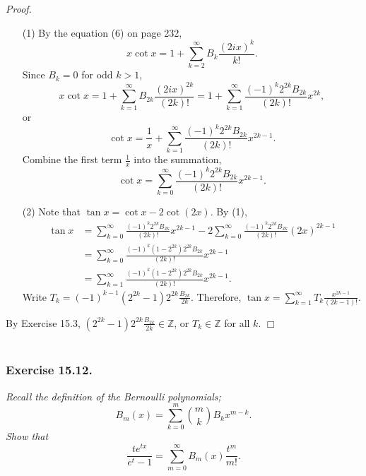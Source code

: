 \documentclass{article}
\begin{document}
\emph{Proof.}
\begin{enumerate}
\item[(1)]
By the equation (6) on page 232,
$$x \cot x = 1 + \sum_{k=2}^{\infty} B_k \frac{(2ix)^k}{k!}.$$
Since $B_k = 0$ for odd $k > 1$,
$$x \cot x
= 1 + \sum_{k=1}^{\infty} B_{2k} \frac{(2ix)^{2k}}{(2k)!}
= 1 + \sum_{k=1}^{\infty} \frac{(-1)^k 2^{2k}B_{2k}}{(2k)!} x^{2k},$$
or
$$\cot x
= \frac{1}{x} + \sum_{k=1}^{\infty} \frac{(-1)^k 2^{2k}B_{2k}}{(2k)!} x^{2k-1}.$$
Combine the first term $\frac{1}{x}$ into the summation,
$$\cot x = \sum_{k=0}^{\infty} \frac{(-1)^k 2^{2k}B_{2k}}{(2k)!} x^{2k-1}.$$
\item[(2)]
Note that $\tan x = \cot x - 2 \cot(2x)$.
By (1),
\begin{align*}
\tan x
&= \sum_{k=0}^{\infty} \frac{(-1)^k 2^{2k}B_{2k}}{(2k)!} x^{2k-1}
- 2 \sum_{k=0}^{\infty} \frac{(-1)^k 2^{2k}B_{2k}}{(2k)!} (2x)^{2k-1} \\
&= \sum_{k=0}^{\infty} \frac{(-1)^k (1 - 2^{2k}) 2^{2k} B_{2k}}{(2k)!} x^{2k-1} \\
&= \sum_{k=1}^{\infty} \frac{(-1)^k (1 - 2^{2k}) 2^{2k} B_{2k}}{(2k)!} x^{2k-1}.
\end{align*}
Write $T_k = (-1)^{k-1} (2^{2k} - 1) 2^{2k} \frac{B_{2k}}{2k}$.
Therefore, $\tan x = \sum_{k=1}^{\infty} T_k \frac{x^{2k - 1}}{(2k - 1)!}$.
\end{enumerate}
By Exercise 15.3, $(2^{2k} - 1) 2^{2k} \frac{B_{2k}}{2k} \in \mathbb{Z}$,
or $T_k \in \mathbb{Z}$ for all $k$.
$\Box$ \\\\






\subsubsection*{Exercise 15.12.}
\emph{Recall the definition of the Bernoulli polynomials;
$$B_m(x) = \sum_{k=0}^{m} {m \choose k} B_k x^{m-k}.$$
Show that
$$\frac{te^{tx}}{e^t - 1} = \sum_{m=0}^{\infty} B_m(x) \frac{t^m}{m!}.$$} \\
\end{document}
